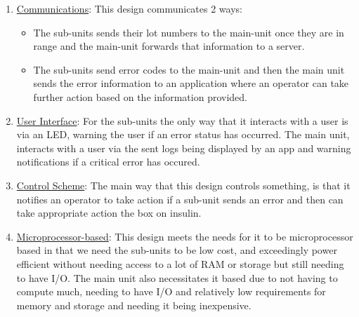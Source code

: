\begin{enumerate}
  \item \underline{Communications}: This design communicates 2 ways:
        \begin{itemize}
               \item The sub-units sends their lot numbers to the main-unit once they are in range and the main-unit forwards that information to a server.
               \item The sub-units send error codes to the main-unit and then the main unit sends the error information to an application where an operator can take further action based on the information provided.
        \end{itemize}
  \item \underline{User Interface}: For the sub-units the only way that it interacts with a user is via an LED, warning the user if an error status has occurred. The main unit, interacts with a user via the sent logs being displayed by an app and warning notifications if a critical error has occured.
  \item \underline{Control Scheme}: The main way that this design controls something, is that it notifies an operator to take action if a sub-unit sends an error and then can take appropriate action the box on insulin.
  \item \underline{Microprocessor-based}: This design meets the needs for it to be microprocessor based in that we need the sub-units to be low cost, and exceedingly power efficient without needing access to a lot of RAM or storage but still needing to have I/O. The main unit also necessitates it based due to not having to compute much, needing to have I/O and relatively low requirements for memory and storage and needing it being inexpensive.
\end{enumerate}

